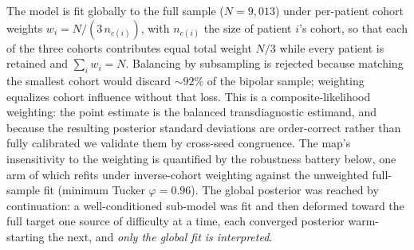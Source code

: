 The model is fit globally to the full sample ($N=9{,}013$) under per-patient cohort weights
$w_i = N/(3\,n_{c(i)})$, with $n_{c(i)}$ the size of patient $i$'s cohort, so that each of the
three cohorts contributes equal total weight $N/3$ while every patient is retained and
$\sum_i w_i = N$. Balancing by subsampling is rejected because matching the smallest cohort would discard
${\sim}92\%$ of the bipolar sample; weighting equalizes cohort influence without that loss. This is a
composite-likelihood weighting: the point estimate is the balanced transdiagnostic estimand, and because the
resulting posterior standard deviations are order-correct rather than fully calibrated we validate them by
cross-seed congruence. The map's insensitivity to the weighting is quantified by the robustness battery below,
one arm of which refits under inverse-cohort weighting against the unweighted full-sample fit (minimum Tucker
$\varphi=0.96$). The global posterior was reached by continuation: a
well-conditioned sub-model was fit and then deformed toward the full target one source of
difficulty at a time, each converged posterior warm-starting the next, and \emph{only the
global fit is interpreted}.

